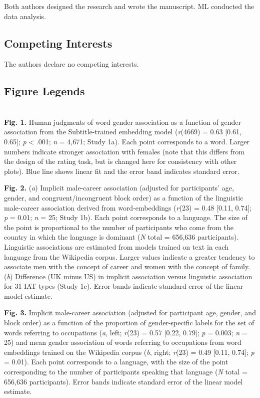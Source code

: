 \documentclass[9pt,twocolumn]{pnas-new}
\begin{document}
Both authors designed the research and wrote the manuscript. ML conducted the data analysis.

\subsection*{Competing Interests}
The authors declare no competing interests.

\subsection*{Figure Legends} ~\\


{\bf Fig. 1.} Human judgments of word gender association as
a function of gender association from the Subtitle-trained embedding model
(\emph{r}(4669) = 0.63 {[}0.61, 0.65{]}; \emph{p} \textless{} .001; {\emph n} = 4,671; Study 1a). Each point corresponds to a word. Larger numbers indicate
stronger association with females (note that this differs from the
design of the rating task, but is changed here for consistency with
other plots). Blue line shows linear fit and the error band indicates
standard error.


 {\bf Fig. 2.} ({\it a})  Implicit male-career association (adjusted for participants' age, gender, and congruent/incongruent block order) as a function of the linguistic male-career association derived from word-embeddings (\emph{r}(23) = 0.48 {[}0.11, 0.74{]}; \emph{p} = 0.01; \emph{n} = 25; Study 1b). Each point corresponds to a language. The size of the point is proportional to the number of participants who come from the country in which the language is dominant ({\it N} total = 656,636 participants). Linguistic associations are estimated from models trained on text in each language from the Wikipedia corpus. Larger values indicate a greater tendency to associate men with the concept of career and women with the concept of family. ({\it b}) Difference (UK minus US) in implicit association versus linguistic association for 31 IAT types (Study 1c). Error bands indicate standard error of the linear model
estimate.

{\bf Fig. 3.} Implicit male-career association (adjusted for participant age,
gender, and block order) as a function of the proportion of gender-specific labels for the set of words referring to occupations ({\it a}, left; \emph{r}(23) = 0.57 {[}0.22, 0.79{]}; \emph{p} = 0.003; \emph{n} = 25) and  mean gender association of words
referring to occupations from word embeddings trained on the Wikipedia corpus ({\it b}, right; \emph{r}(23) = 0.49 {[}0.11, 0.74{]}; \emph{p} = 0.01). Each point corresponds to a language, with the size of the point corresponding to the number of participants
speaking that language ({\it N} total = 656,636 participants). Error bands indicate standard error of the
linear model estimate.
\end{document}
